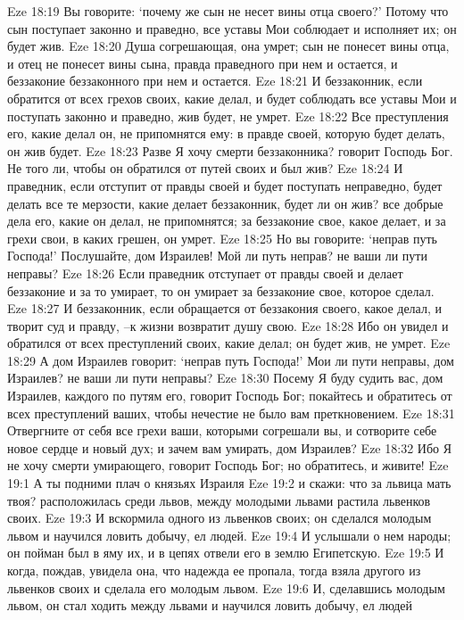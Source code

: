 Eze 18:19  Вы говорите: `почему же сын не несет вины отца своего?' Потому что сын поступает законно и праведно, все уставы Мои соблюдает и исполняет их; он будет жив.
Eze 18:20  Душа согрешающая, она умрет; сын не понесет вины отца, и отец не понесет вины сына, правда праведного при нем и остается, и беззаконие беззаконного при нем и остается.
Eze 18:21  И беззаконник, если обратится от всех грехов своих, какие делал, и будет соблюдать все уставы Мои и поступать законно и праведно, жив будет, не умрет.
Eze 18:22  Все преступления его, какие делал он, не припомнятся ему: в правде своей, которую будет делать, он жив будет.
Eze 18:23  Разве Я хочу смерти беззаконника? говорит Господь Бог. Не того ли, чтобы он обратился от путей своих и был жив?
Eze 18:24  И праведник, если отступит от правды своей и будет поступать неправедно, будет делать все те мерзости, какие делает беззаконник, будет ли он жив? все добрые дела его, какие он делал, не припомнятся; за беззаконие свое, какое делает, и за грехи свои, в каких грешен, он умрет.
Eze 18:25  Но вы говорите: `неправ путь Господа!' Послушайте, дом Израилев! Мой ли путь неправ? не ваши ли пути неправы?
Eze 18:26  Если праведник отступает от правды своей и делает беззаконие и за то умирает, то он умирает за беззаконие свое, которое сделал.
Eze 18:27  И беззаконник, если обращается от беззакония своего, какое делал, и творит суд и правду, --к жизни возвратит душу свою.
Eze 18:28  Ибо он увидел и обратился от всех преступлений своих, какие делал; он будет жив, не умрет.
Eze 18:29  А дом Израилев говорит: `неправ путь Господа!' Мои ли пути неправы, дом Израилев? не ваши ли пути неправы?
Eze 18:30  Посему Я буду судить вас, дом Израилев, каждого по путям его, говорит Господь Бог; покайтесь и обратитесь от всех преступлений ваших, чтобы нечестие не было вам преткновением.
Eze 18:31  Отвергните от себя все грехи ваши, которыми согрешали вы, и сотворите себе новое сердце и новый дух; и зачем вам умирать, дом Израилев?
Eze 18:32  Ибо Я не хочу смерти умирающего, говорит Господь Бог; но обратитесь, и живите!
Eze 19:1  А ты подними плач о князьях Израиля
Eze 19:2  и скажи: что за львица мать твоя? расположилась среди львов, между молодыми львами растила львенков своих.
Eze 19:3  И вскормила одного из львенков своих; он сделался молодым львом и научился ловить добычу, ел людей.
Eze 19:4  И услышали о нем народы; он пойман был в яму их, и в цепях отвели его в землю Египетскую.
Eze 19:5  И когда, пождав, увидела она, что надежда ее пропала, тогда взяла другого из львенков своих и сделала его молодым львом.
Eze 19:6  И, сделавшись молодым львом, он стал ходить между львами и научился ловить добычу, ел людей
